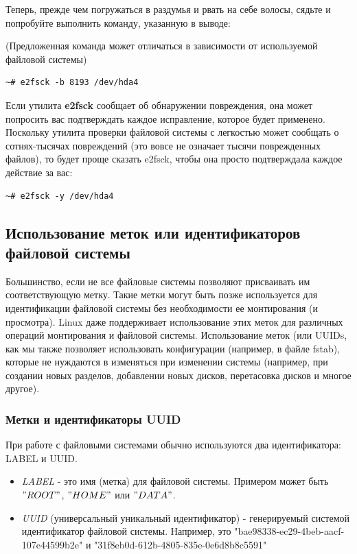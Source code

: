 \documentclass[10pt]{book}
\begin{document}
Теперь, прежде чем погружаться в раздумья и рвать на себе волосы, сядьте и попробуйте выполнить команду, указанную в выводе:

(Предложенная команда может отличаться в зависимости от используемой файловой системы)

\begin{tcolorbox} 
\begin{lstlisting}
~# e2fsck -b 8193 /dev/hda4
\end{lstlisting}
\end{tcolorbox}

Если утилита \textbf{e2fsck} сообщает об обнаружении повреждения, она может попросить вас подтверждать каждое исправление, которое будет применено. Поскольку утилита проверки файловой системы с легкостью может сообщать о сотнях-тысячах повреждений (это вовсе не означает тысячи поврежденных файлов), то будет проще сказать e2fsck, чтобы она просто подтверждала каждое действие за вас:

\begin{tcolorbox} 
\begin{lstlisting}
~# e2fsck -y /dev/hda4
\end{lstlisting}
\end{tcolorbox}

\subsection{Использование меток или идентификаторов файловой системы}

Большинство, если не все файловые системы позволяют присваивать им соответствующую метку. Такие метки могут быть позже используется для идентификации файловой системы без необходимости ее монтирования (и просмотра). Linux даже поддерживает использование этих меток для различных операций монтирования и файловой системы. Использование меток (или UUIDs, как мы также позволяет использовать конфигурации (например, в файле fstab), которые не нуждаются в изменяться при изменении системы (например, при создании новых разделов, добавлении новых дисков,
перетасовка дисков и многое другое).

\subsubsection{Метки и идентификаторы UUID}
При работе с файловыми системами обычно используются два идентификатора: LABEL и UUID.

\begin{itemize}
\item \textit{LABEL} - это имя (метка) для файловой системы. Примером может быть $"ROOT"$, $"HOME"$ или $"DATA"$.
\item \textit{UUID} (универсальный уникальный идентификатор) - генерируемый системой идентификатор файловой системы. Например,
это "bae98338-ec29-4beb-aacf-107e44599b2e" и "31f8eb0d-612b-4805-835e-0e6d8b8c5591"
\end{itemize}
\end{document}
